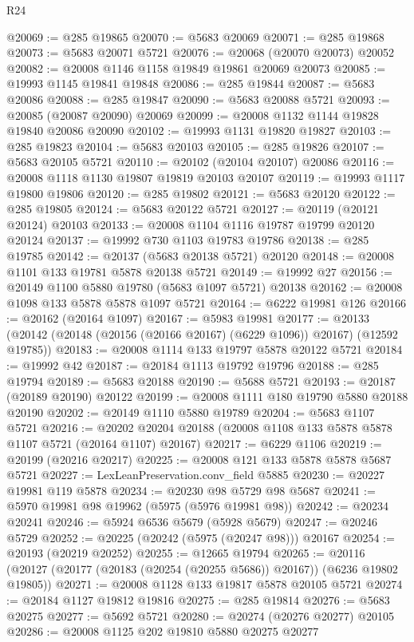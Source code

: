 \begin{lexlean}{R24}
\begin{coremodule}
@20069 := @285 @19865
@20070 := @5683 @20069
@20071 := @285 @19868
@20073 := @5683 @20071 @5721
@20076 := @20068 (@20070 @20073) @20052
@20082 := @20008 @1146 @1158 @19849 @19861 @20069 @20073
@20085 := @19993 @1145 @19841 @19848
@20086 := @285 @19844
@20087 := @5683 @20086
@20088 := @285 @19847
@20090 := @5683 @20088 @5721
@20093 := @20085 (@20087 @20090) @20069
@20099 := @20008 @1132 @1144 @19828 @19840 @20086 @20090
@20102 := @19993 @1131 @19820 @19827
@20103 := @285 @19823
@20104 := @5683 @20103
@20105 := @285 @19826
@20107 := @5683 @20105 @5721
@20110 := @20102 (@20104 @20107) @20086
@20116 := @20008 @1118 @1130 @19807 @19819 @20103 @20107
@20119 := @19993 @1117 @19800 @19806
@20120 := @285 @19802
@20121 := @5683 @20120
@20122 := @285 @19805
@20124 := @5683 @20122 @5721
@20127 := @20119 (@20121 @20124) @20103
@20133 := @20008 @1104 @1116 @19787 @19799 @20120 @20124
@20137 := @19992 @730 @1103 @19783 @19786
@20138 := @285 @19785
@20142 := @20137 (@5683 @20138 @5721) @20120
@20148 := @20008 @1101 @133 @19781 @5878 @20138 @5721
@20149 := @19992 @27
@20156 := @20149 @1100 @5880 @19780 (@5683 @1097 @5721) @20138
@20162 := @20008 @1098 @133 @5878 @5878 @1097 @5721
@20164 := @6222 @19981 @126
@20166 := @20162 (@20164 @1097)
@20167 := @5983 @19981
@20177 := @20133 (@20142 (@20148 (@20156 (@20166 @20167) (@6229 @1096)) @20167) (@12592 @19785))
@20183 := @20008 @1114 @133 @19797 @5878 @20122 @5721
@20184 := @19992 @42
@20187 := @20184 @1113 @19792 @19796
@20188 := @285 @19794
@20189 := @5683 @20188
@20190 := @5688 @5721
@20193 := @20187 (@20189 @20190) @20122
@20199 := @20008 @1111 @180 @19790 @5880 @20188 @20190
@20202 := @20149 @1110 @5880 @19789
@20204 := @5683 @1107 @5721
@20216 := @20202 @20204 @20188 (@20008 @1108 @133 @5878 @5878 @1107 @5721 (@20164 @1107) @20167)
@20217 := @6229 @1106
@20219 := @20199 (@20216 @20217)
@20225 := @20008 @121 @133 @5878 @5878 @5687 @5721
@20227 := LexLeanPreservation.conv_field @5885
@20230 := @20227 @19981 @119 @5878
@20234 := @20230 @98 @5729 @98 @5687
@20241 := @5970 @19981 @98 @19962 (@5975 (@5976 @19981 @98))
@20242 := @20234 @20241
@20246 := @5924 @6536 @5679 (@5928 @5679)
@20247 := @20246 @5729
@20252 := @20225 (@20242 (@5975 (@20247 @98))) @20167
@20254 := @20193 (@20219 @20252)
@20255 := @12665 @19794
@20265 := @20116 (@20127 (@20177 (@20183 (@20254 (@20255 @5686)) @20167)) (@6236 @19802 @19805))
@20271 := @20008 @1128 @133 @19817 @5878 @20105 @5721
@20274 := @20184 @1127 @19812 @19816
@20275 := @285 @19814
@20276 := @5683 @20275
@20277 := @5692 @5721
@20280 := @20274 (@20276 @20277) @20105
@20286 := @20008 @1125 @202 @19810 @5880 @20275 @20277

\end{coremodule}
\end{lexlean}
